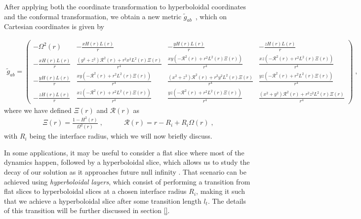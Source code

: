 After applying both the coordinate transformation to hyperboloidal coordinates and the conformal transformation, we obtain a new metric $\tilde{g}_{ab}$~, which on Cartesian coordinates is given by

\begin{align}
    \tilde{g}_{ab} = 
    \begin{pmatrix}
        -\Omega^2(r) & -\frac{x H(r) L(r)}{r} & -\frac{y H(r) L(r)}{r} & -\frac{z H(r) L(r)}{r} \\
        -\frac{x H(r) L(r)}{r} & \frac{(y^2 + z^2) \mathcal{R}^2(r) + r^2 x^2 L^2(r) \Xi(r)}{r^4} & \frac{x y (-\mathcal{R}^2(r) + r^2 L^2(r) \Xi(r))}{r^4} & \frac{x z (-\mathcal{R}^2(r) + r^2 L^2(r) \Xi(r))}{r^4} \\
        -\frac{y H(r) L(r)}{r} & \frac{x y (-\mathcal{R}^2(r) + r^2 L^2(r) \Xi(r))}{r^4} & \frac{(x^2 + z^2) \mathcal{R}^2(r) + r^2 y^2 L^2(r) \Xi(r)}{r^4} & \frac{y z (-\mathcal{R}^2(r) + r^2 L^2(r) \Xi(r))}{r^4} \\
        -\frac{z H(r) L(r)}{r} & \frac{x z (-\mathcal{R}^2(r) + r^2 L^2(r) \Xi(r))}{r^4} & \frac{y z (-\mathcal{R}^2(r) + r^2 L^2(r) \Xi(r))}{r^4} & \frac{(x^2 + y^2) \mathcal{R}^2(r) + r^2 z^2 L^2(r) \Xi(r)}{r^4}
    \end{pmatrix} \; ,
\end{align}
%
where we have defined $\Xi(r)$ and $\mathcal{R}(r)$ as
%
\begin{align}
    \Xi(r) = \frac{1 - H^2(r)}{\Omega^2(r)} \; , \quad \quad \quad \mathcal{R}(r) = r - R_i + R_i \Omega(r) \; ,
\end{align}
%
with $R_i$ being the interface radius, which we will now briefly discuss.

In some applications, it may be useful to consider a flat slice where most of the dynamics happen, followed by a hyperboloidal slice, which allows us to study the decay of our solution as it approaches future null infinity \cite{Hyperboloidal_layers_for_hyperbolic_equations_on_unbounded_domains,The_evolution_of_hyperboloidal_data_with_the_dual_foliation_formalism_Mathematical_analysis_and_wave_equation_tests}. That scenario can be achieved using \textit{hyperboloidal layers}, which consist of performing a transition from flat slices to hyperboloidal slices at a chosen interface radius $R_i$, making it such that we achieve a hyperboloidal slice after some transition length $l_t$. The details of this transition will be further discussed in section \ref{}.


